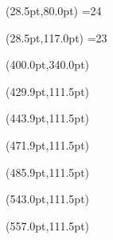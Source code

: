 \documentclass[a4paper,11pt]{article}
\begin{document}
\begin{textblock*}{420pt}(28.5pt,80.0pt)
\setcounter{count}{0}
\loop\unless\ifnum\value{count}=24
  \makebox[17.35pt][c]{\LARGE{\StrChar{\examusername}{\value{count}}}}%
\repeat
\end{textblock*}

\begin{textblock*}{400pt}(28.5pt,117.0pt)
\setcounter{count}{0}
\loop\unless\ifnum\value{count}=23
  \makebox[16.62pt][c]{\LARGE{\StrChar{\examcoursename}{\value{count}}}}%
\repeat
\end{textblock*}

\begin{textblock*}{180pt}(400.0pt,340.0pt)
\centering\large{\examcreatorname}
\vspace*{\fill}
\end{textblock*}

\begin{textblock*}{10pt}(429.9pt,111.5pt)\LARGE{}\end{textblock*}
\begin{textblock*}{10pt}(443.9pt,111.5pt)\LARGE{}\end{textblock*}
\begin{textblock*}{10pt}(471.9pt,111.5pt)\LARGE{}\end{textblock*}
\begin{textblock*}{10pt}(485.9pt,111.5pt)\LARGE{}\end{textblock*}
\begin{textblock*}{10pt}(543.0pt,111.5pt)\LARGE{}\end{textblock*}
\begin{textblock*}{10pt}(557.0pt,111.5pt)\LARGE{}\end{textblock*}
\end{document}
